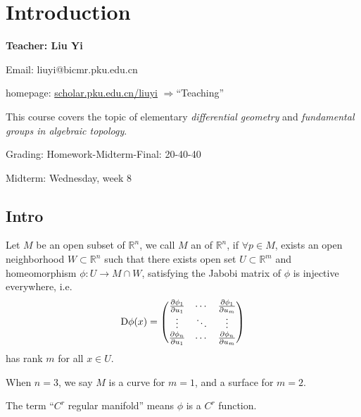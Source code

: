 \section{Introduction}
\label{sec:Introduction}
\begin{center}
	\sffamily\large\bfseries Teacher: Liu Yi

	Email: liuyi@bicmr.pku.edu.cn

	homepage: \url{scholar.pku.edu.cn/liuyi} $\Rightarrow$``Teaching''
\end{center}

This course covers the topic of elementary \textit{differential geometry}
and \textit{fundamental groups in algebraic topology}.

Grading: Homework-Midterm-Final: 20-40-40

Midterm: Wednesday, week 8

\subsection{Intro}
\label{sub:Intro}
\begin{definition}[Manifold]
	Let $M$ be an open subset of $\mathbb{R}^n$, we call $M$ an  of $\mathbb{R}^n$, if $\forall p\in M$, exists an open neighborhood
	$W \subset \mathbb{R}^n$ such that there exists open set $U \subset \mathbb{R}^m$
	and homeomorphism $\phi: U\to M \cap W$, satisfying the Jabobi matrix of $\phi$
	is injective everywhere, i.e.
	\[
	\mathop{}\!\mathrm{D}\phi(x) = \begin{pmatrix}
		\frac{\partial\phi_1}{\partial u_1} &\cdots &\frac{\partial\phi_1}{\partial u_m}\\
		\vdots &\ddots &\vdots \\
		\frac{\partial\phi_n}{\partial u_1} &\cdots &\frac{\partial\phi_n}{\partial u_m}
	\end{pmatrix}
	\]
	has rank $m$ for all  $x\in U$.
\end{definition}
When $n=3$, we say $M$ is a curve for $m=1$, and a surface for $m=2$.
\begin{remark}
    The term ``$C^r$ regular manifold'' means $\phi$ is a  $C^r$ function.
\end{remark}

